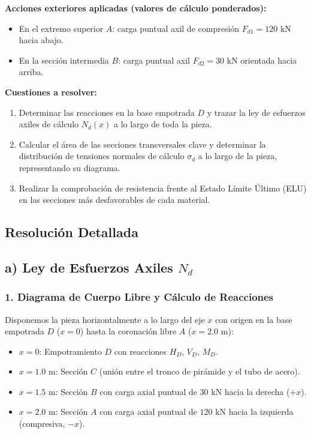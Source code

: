 \begin{tcolorbox}[colback=blue!5!white,colframe=blue!75!black,title=\textbf{Problema 8: Barra Compuesta (Tubo de Acero y Tronco de Pirámide) bajo Compresión}]
    \textbf{Acciones exteriores aplicadas (valores de cálculo ponderados):}
    \begin{itemize}
        \item En el extremo superior $A$: carga puntual axil de compresión $F_{d1} = 120\text{ kN}$ hacia abajo.
        \item En la sección intermedia $B$: carga puntual axil $F_{d2} = 30\text{ kN}$ orientada hacia arriba.
    \end{itemize}

    \textbf{Cuestiones a resolver:}
    \begin{enumerate}[label=\textbf{\Alph*)}]
        \item Determinar las reacciones en la base empotrada $D$ y trazar la ley de esfuerzos axiles de cálculo $N_d(x)$ a lo largo de toda la pieza.
        \item Calcular el área de las secciones transversales clave y determinar la distribución de tensiones normales de cálculo $\sigma_d$ a lo largo de la pieza, representando su diagrama.
        \item Realizar la comprobación de resistencia frente al Estado Límite Último (ELU) en las secciones más desfavorables de cada material.
    \end{enumerate}
\end{tcolorbox}

\subsection*{Resolución Detallada}

\subsection*{a) Ley de Esfuerzos Axiles $N_d$}

\subsubsection*{1. Diagrama de Cuerpo Libre y Cálculo de Reacciones}
Disponemos la pieza horizontalmente a lo largo del eje $x$ con origen en la base empotrada $D$ ($x = 0$) hasta la coronación libre $A$ ($x = 2.0\text{ m}$):
\begin{itemize}
    \item $x = 0$: Empotramiento $D$ con reacciones $H_D$, $V_D$, $M_D$.
    \item $x = 1.0\text{ m}$: Sección $C$ (unión entre el tronco de pirámide y el tubo de acero).
    \item $x = 1.5\text{ m}$: Sección $B$ con carga axial puntual de $30\text{ kN}$ hacia la derecha ($+x$).
    \item $x = 2.0\text{ m}$: Sección $A$ con carga axial puntual de $120\text{ kN}$ hacia la izquierda (compresiva, $-x$).
\end{itemize}

